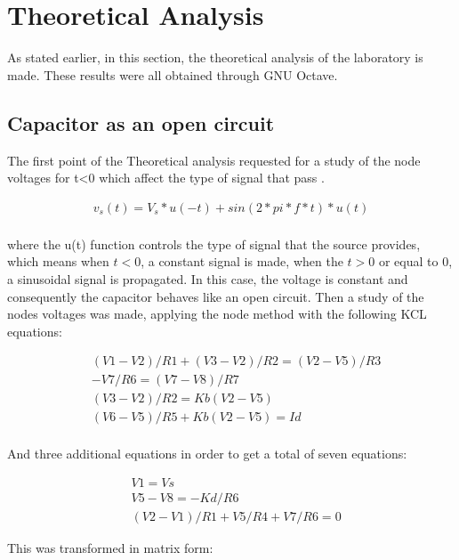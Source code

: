 \section{Theoretical Analysis}
\label{sec:analysis}

\par As stated earlier, in this section, the theoretical analysis of the laboratory is made. These results were all obtained through GNU Octave.



\subsection{Capacitor as an open circuit} 

\par The first point of the Theoretical analysis requested for a study of the node voltages for t<0 which affect the type of signal that pass . 

\begin{align*}  
v_s(t)=V_s*u(-t)+sin(2*pi*f*t)*u(t)\\   
\end{align*} 

where the u(t) function controls the type of signal that the source provides, which means when $t<0$, a constant signal is made, when the $t>0$ or equal to 0, a sinusoidal signal is propagated.  
In this case, the voltage is constant and consequently the capacitor behaves like an open circuit. Then a study of the nodes voltages was made, applying the node method with the following KCL equations: 

\begin{align*} 
&(V1-V2)/R1+(V3-V2)/R2 = (V2-V5)/R3 \\ 
&-V7/R6 = (V7-V8)/R7\\
&(V3-V2)/R2 = Kb(V2-V5) \\
&(V6-V5)/R5+Kb(V2-V5) = Id \\
\end{align*} 

And three additional equations in order to get a total of seven equations: 

\begin{align*} 
&V1=Vs \\ 
&V5-V8=-Kd/R6\\ 
&(V2-V1)/R1+V5/R4+V7/R6=0
\end{align*} 

This was transformed in matrix form:

